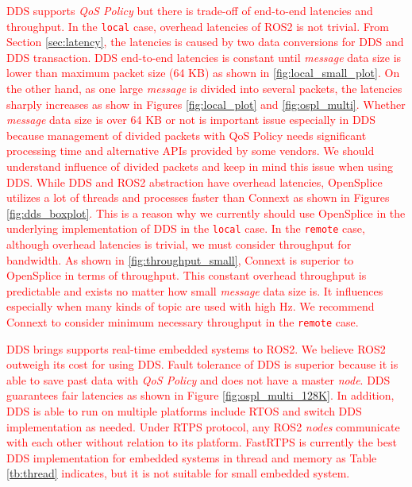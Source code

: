 \documentclass{sig-alternate-05-2015}
\begin{document}
\textcolor{red}{
DDS supports \emph{QoS Policy} but there is trade-off of end-to-end latencies and throughput.
In the \texttt{local} case, overhead latencies of ROS2 is not trivial.
From Section \ref{sec:latency}, the latencies is caused by two data conversions for DDS and DDS transaction.
DDS end-to-end latencies is constant until \emph{message} data size is lower than maximum packet size (64 KB) as shown in \ref{fig:local_small_plot}.
On the other hand, as one large \emph{message} is divided into several packets, the latencies sharply increases as show in Figures \ref{fig:local_plot} and \ref{fig:ospl_multi}.
Whether \emph{message} data size is over 64 KB or not is important issue especially in DDS because management of divided packets with QoS Policy needs significant processing time and alternative APIs provided by some vendors.
We should understand influence of divided packets and keep in mind this issue when using DDS.
While DDS and ROS2 abstraction have overhead latencies, OpenSplice utilizes a lot of threads and processes faster than Connext as shown in Figures \ref{fig:dds_boxplot}.
This is a reason why we currently should use OpenSplice in the underlying implementation of DDS in the \texttt{local} case.
In the \texttt{remote} case, although overhead latencies is trivial, we must consider throughput for bandwidth.
As shown in \ref{fig:throughput_small}, Connext is superior to OpenSplice in terms of throughput.
This constant overhead throughput is predictable and exists no matter how small \emph{message} data size is.
It influences especially when many kinds of topic are used with high Hz.
We recommend Connext to consider minimum necessary throughput in the \texttt{remote} case.
}

\textcolor{red}{
DDS brings supports real-time embedded systems to ROS2.
We believe ROS2 outweigh its cost for using DDS.
Fault tolerance of DDS is superior because it is able to save past data with \emph{QoS Policy} and does not have a master \emph{node}.
DDS guarantees fair latencies as shown in Figure \ref{fig:ospl_multi_128K}.
In addition, DDS is able to run on multiple platforms include RTOS and switch DDS implementation as needed.
Under RTPS protocol, any ROS2 \emph{nodes} communicate with each other without relation to its platform.
FastRTPS is currently the best DDS implementation for embedded systems in thread and memory as Table \ref{tb:thread} indicates, but it is not suitable for small embedded system.
}
\end{document}
